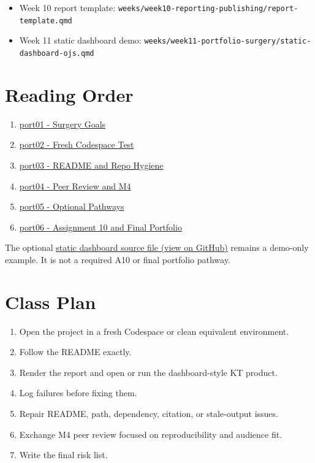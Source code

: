\documentclass[
  letterpaper,
  DIV=11,
  numbers=noendperiod,
  oneside]{scrreprt}
\providecommand{\tightlist}{%
  \setlength{\itemsep}{0pt}\setlength{\parskip}{0pt}}
\begin{document}
\begin{itemize}
\tightlist
\item
  Week 10 report template:
  \texttt{weeks/week10-reporting-publishing/report-template.qmd}
\item
  Week 11 static dashboard demo:
  \texttt{weeks/week11-portfolio-surgery/static-dashboard-ojs.qmd}
\end{itemize}

\section*{Reading Order}\label{reading-order-5}


\begin{enumerate}
\def\labelenumi{\arabic{enumi}.}
\tightlist
\item
  \href{port01-overview-and-goals.qmd}{port01 - Surgery Goals}
\item
  \href{port02-fresh-codespace-test.qmd}{port02 - Fresh Codespace Test}
\item
  \href{port03-readme-repo-hygiene.qmd}{port03 - README and Repo
  Hygiene}
\item
  \href{port04-peer-review-m4.qmd}{port04 - Peer Review and M4}
\item
  \href{port05-optional-pathways.qmd}{port05 - Optional Pathways}
\item
  \href{port06-assignment-a10-final-portfolio.qmd}{port06 - Assignment
  10 and Final Portfolio}
\end{enumerate}

The optional
\href{https://github.com/ehsanx/HDSx/blob/main/weeks/week11-portfolio-surgery/static-dashboard-ojs.qmd}{static
dashboard source file (view on GitHub)} remains a demo-only example. It
is not a required A10 or final portfolio pathway.

\section*{Class Plan}\label{class-plan-5}


\begin{enumerate}
\def\labelenumi{\arabic{enumi}.}
\tightlist
\item
  Open the project in a fresh Codespace or clean equivalent environment.
\item
  Follow the README exactly.
\item
  Render the report and open or run the dashboard-style KT product.
\item
  Log failures before fixing them.
\item
  Repair README, path, dependency, citation, or stale-output issues.
\item
  Exchange M4 peer review focused on reproducibility and audience fit.
\item
  Write the final risk list.
\end{enumerate}
\end{document}

